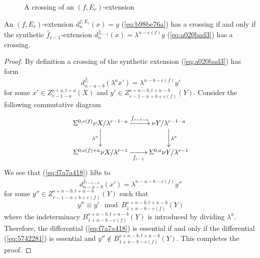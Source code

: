 \documentclass{amsart}
\numberwithin{equation}{section}
\begin{document}
\begin{figure}[h]
{
}
\caption{A crossing of an $(f,E_r)$-extension}\label{fig:66241bf6}
\end{figure}

\begin{proposition}\label{prop:cross-f-Er}
    An $(f,E_r)$-extension $d_{n}^{f,E_r}(x)=y$ (\ref{eq:b98be76a}) has a crossing if and only if the synthetic $\hat f_{r-1}$-extension $d_{n}^{\hat f_{r-1}}(x)=\lambda^{n-e(f)} y$ (\ref{eq:a020bad3}) has a crossing.
\end{proposition}

\begin{proof}
    By definition a crossing of the synthetic extension (\ref{eq:a020bad3}) has form
    \begin{equation}\label{eq:f7a7a418}
        d_{n-a-b}^{\hat f_r}(\lambda^ax')=\lambda^{n-b-e(f)}y'
    \end{equation}
    for some $x'\in Z_{r-1-a}^{s+a,t+a}(X)$ and $y'\in Z_{r-1-n+b+e(f)}^{s+n-b,t+n-b}(Y)$. Consider the following commutative diagram
    $$\xymatrix{
        \Sus^{0,e(f)}\nu X/\lambda^{r-1-a} \ar[r]^-{\hat f_{r-1-a}} \ar[d]_{\lambda^a} & \nu Y/\lambda^{r-1-a} \ar[d]^{\lambda^a}\\
        \Sus^{0,e(f)+a}\nu X/\lambda^{r-1}\ar[r]_-{\hat f_{r-1}} & \Sus^{0,a}\nu Y/\lambda^{r-1}\\
    }$$
    We see that (\ref{eq:f7a7a418}) lifts to
    \begin{equation}\label{eq:5742281}
        d_{n-a-b}^{\hat f_{r-1-a}}(x')= \lambda^{n-a-b-e(f)}y''
    \end{equation}
    for some $y''\in Z_{r-1-n+b+e(f)}^{s+n-b,t+n-b}(Y)$ such that
    $$y''\equiv y'\mod B_{1+n-b-e(f)}^{s+n-b,t+n-b}(Y)$$
    where the indeterminacy $B_{1+n-b-e(f)}^{s+n-b,t+n-b}(Y)$ is introduced by dividing $\lambda^a$.
    Therefore, the differential (\ref{eq:f7a7a418}) is essential if and only if the differential (\ref{eq:5742281}) is essential and $y''\notin B_{1+n-b-e(f)}^{s+n-b,t+n-b}(Y)$. This completes the proof.
\end{proof}
\end{document}
